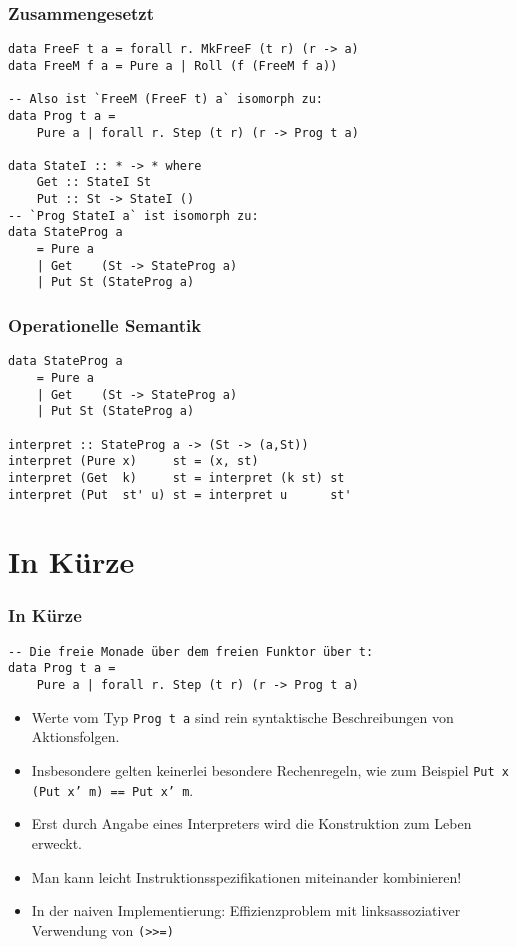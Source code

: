 \documentclass[12pt,compress,ngerman,utf8,t]{beamer}
\begin{document}
\begin{frame}[fragile]\frametitle{Zusammengesetzt}
  \begin{verbatim}
data FreeF t a = forall r. MkFreeF (t r) (r -> a)
data FreeM f a = Pure a | Roll (f (FreeM f a))

-- Also ist `FreeM (FreeF t) a` isomorph zu:
data Prog t a =
    Pure a | forall r. Step (t r) (r -> Prog t a)

data StateI :: * -> * where
    Get :: StateI St
    Put :: St -> StateI ()
-- `Prog StateI a` ist isomorph zu:
data StateProg a
    = Pure a
    | Get    (St -> StateProg a)
    | Put St (StateProg a)
  \end{verbatim}
\end{frame}

\begin{frame}[fragile]\frametitle{Operationelle Semantik}
  \begin{verbatim}
data StateProg a
    = Pure a
    | Get    (St -> StateProg a)
    | Put St (StateProg a)

interpret :: StateProg a -> (St -> (a,St))
interpret (Pure x)     st = (x, st)
interpret (Get  k)     st = interpret (k st) st
interpret (Put  st' u) st = interpret u      st'
  \end{verbatim}
\end{frame}


\section{In Kürze}
\begin{frame}[fragile]\frametitle{In Kürze}
  \begin{verbatim}
-- Die freie Monade über dem freien Funktor über t:
data Prog t a =
    Pure a | forall r. Step (t r) (r -> Prog t a)
  \end{verbatim}

  \begin{itemize}
    \item Werte vom Typ \texttt{Prog t a} sind rein syntaktische Beschreibungen
    von Aktionsfolgen.
    \item Insbesondere gelten keinerlei besondere Rechenregeln, wie zum
    Beispiel \texttt{Put x (Put x' m) == Put x' m}.
    \item Erst durch Angabe eines Interpreters wird die Konstruktion zum Leben
    erweckt.
    \item Man kann leicht Instruktionsspezifikationen miteinander kombinieren!
    \item In der naiven Implementierung: Effizienzproblem mit linksassoziativer
    Verwendung von \texttt{(>>=)}
  \end{itemize}
\end{frame}
\end{document}
